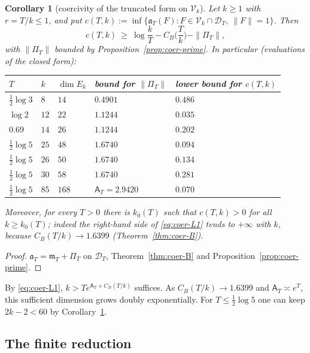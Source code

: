 \documentclass[10pt]{amsart}
\newtheorem{corollary}[theorem]{Corollary}
\theoremstyle{definition}
\theoremstyle{remark}
\newcommand{\Aconst}{\mathsf A_T}
\newcommand{\PiT}{\Pi_T}
\newcommand{\mT}{\mathfrak m_T}
\begin{document}
\begin{corollary}[coercivity of the truncated form on $\mathcal V_k$]\label{cor:coer-L1}
Let $k\ge1$ with $r=T/k\le1$, and put $c(T,k):=\inf\{\mathfrak a_T(F):F\in\mathcal V_k\cap\mathcal D_T,\ \|F\|=1\}$. Then
\begin{equation}\label{eq:coer-L1}
c(T,k)\ \ge\ \log\frac kT-C_B\Big(\frac Tk\Big)-\|\PiT\| ,
\end{equation}
with $\|\PiT\|$ bounded by Proposition~\ref{prop:coer-prime}. In particular (evaluations of the closed form):
\begin{center}
\begin{tabular}{@{}lllll@{}}
\toprule
$T$ & $k$ & $\dim E_k$ & bound for $\|\PiT\|$ & lower bound for $c(T,k)$\\
\midrule
$\frac12\log3$ & $8$ & $14$ & $0.4901$ & $0.486$\\
$\log2$ & $12$ & $22$ & $1.1244$ & $0.035$\\
$0.69$ & $14$ & $26$ & $1.1244$ & $0.202$\\
$\frac12\log5$ & $25$ & $48$ & $1.6740$ & $0.094$\\
$\frac12\log5$ & $26$ & $50$ & $1.6740$ & $0.134$\\
$\frac12\log5$ & $30$ & $58$ & $1.6740$ & $0.281$\\
$\frac12\log5$ & $85$ & $168$ & $\Aconst=2.9420$ & $0.070$\\
\bottomrule
\end{tabular}
\end{center}
Moreover, for every $T>0$ there is $k_0(T)$ such that $c(T,k)>0$ for all $k\ge k_0(T)$; indeed the right-hand side
of \eqref{eq:coer-L1} tends to $+\infty$ with $k$, because $C_B(T/k)\to1.6399$ (Theorem~\ref{thm:coer-B}).
\end{corollary}
\begin{proof}
$\mathfrak a_T=\mT+\PiT$ on $\mathcal D_T$, Theorem~\ref{thm:coer-B} and Proposition~\ref{prop:coer-prime}.
\end{proof}

By \eqref{eq:coer-L1}, $k>Te^{\Aconst+C_B(T/k)}$ suffices.
As $C_B(T/k)\to1.6399$ and $\Aconst\asymp e^T$, this sufficient dimension
grows doubly exponentially. For $T\le\tfrac12\log5$ one can keep $2k-2<60$
by Corollary~\ref{cor:coer-L1}.




\subsection{The finite reduction}\label{subsec:coer-schur}
\end{document}
